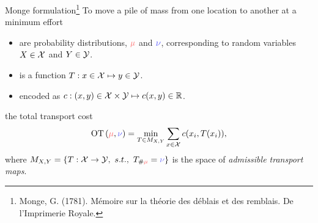 \documentclass[pdf,aspectratio=169,10pt]{beamer}
\begin{document}
\begin{frame}[plain]{Monge formulation\footnote{Monge, G. (1781).
Mémoire sur la théorie des déblais et des remblais.
De l'Imprimerie Royale.}}
 To move a pile of mass from one location to another at a minimum effort\\
\vspace{1em}

\begin{minipage}[t]{0.69\textwidth}
   \begin{itemize}
       \item {} are probability distributions, $\er{\mu}$ and $\eb{\nu}$, corresponding to random variables $X\in{\mathcal{X}}$ and $Y\in{\mathcal{Y}}$. 
       \item {} is a function $T: x \in {\mathcal{X}}\mapsto y\in{\mathcal{Y}}$.
    \item {} encoded as $c: (x,y)\in{\mathcal{X}}\times{\mathcal{Y}}\mapsto c(x,y)\in{\mathbb{R}}$.
   \end{itemize}
\vspace{1em}

  the total transport cost
    \begin{equation}
        \OT{(\er{\mu},\eb{\nu})} = \min_{T\in M_{X,Y}}\sum_{x\in\cX} c(x_i, T(x_i)),
    \end{equation}
     where $M_{X,Y} = \{ T: \cX \to \cY,\ s.t.,\ T_{\#\er{\mu}}=\eb{\nu} \}$ is the space of \emph{admissible transport maps}.
\end{minipage}   
\hfill
\begin{minipage}[t]{0.3\textwidth}
\vspace{2em}
\end{minipage}   

\end{frame}
\end{document}
